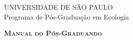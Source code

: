 \begin{titlepage}


\begin{center}
{\LARGE  \sffamily UNIVERSIDADE DE SÃO PAULO \\[1em] 
Programa de Pós-Graduação em Ecologia}
\par
\vspace{0.2\paperheight}
{\Huge \scshape \bfseries Manual do Pós-Graduando \\[2em] 
\the\year}
\par
\vfill
\end{center}
\end{titlepage}

\pagestyle{empty}


